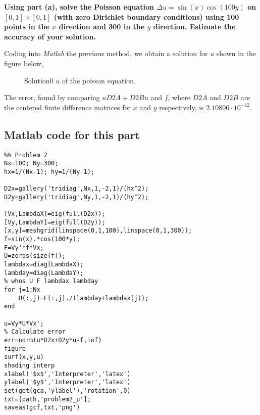 \textbf{Using part (a), solve the Poisson equation $\Delta u = \sin(x)\cos(100y)$ on $[0,1] \times [0,1]$ (with zero Dirichlet boundary conditions) using 100 points in the $x$ direction and 300 in the $y$ direction. Estimate the accuracy of your solution.}

Coding into \textsl{Matlab} the previous method, we obtain a solution for $u$ shown in the figure below,

\begin{figure}[H]
\caption{Solution0 $u$ of the poisson equation.}
\end{figure}

The error, found by comparing $uD2A + D2Bu$ and $f$, where $D2A$ and $D2B$ are the centered finite difference matrices for $x$ and $y$ respectively, is $2.10806\cdot 10^{-12}$. 

\subsection*{Matlab code for this part}
\begin{verbatim}
%% Problem 2
Nx=100; Ny=300;
hx=1/(Nx-1); hy=1/(Ny-1);

D2x=gallery('tridiag',Nx,1,-2,1)/(hx^2);
D2y=gallery('tridiag',Ny,1,-2,1)/(hy^2);

[Vx,LambdaX]=eig(full(D2x));
[Vy,LambdaY]=eig(full(D2y));
[x,y]=meshgrid(linspace(0,1,100),linspace(0,1,300));
f=sin(x).*cos(100*y);
F=Vy'*f*Vx;
U=zeros(size(f));
lambdax=diag(LambdaX);
lambday=diag(LambdaY);
% whos U F lambdax lambday
for j=1:Nx
    U(:,j)=F(:,j)./(lambday+lambdax(j));
end

u=Vy*U*Vx';
% Calculate error
err=norm(u*D2x+D2y*u-f,inf)
figure
surf(x,y,u)
shading interp
xlabel('$x$','Interpreter','latex')
ylabel('$y$','Interpreter','latex')
set(get(gca,'ylabel'),'rotation',0)
txt=[path,'problem2_u'];
saveas(gcf,txt,'png')

\end{verbatim}
